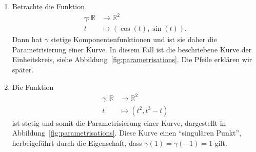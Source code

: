 \documentclass[../main.tex]{subfiles}
\begin{document}
\begin{example}
  \leavevmode
  \begin{enumerate}[(1)]
    \item 
      Betrachte die Funktion
      \begin{align*}
        \gamma \colon \mathbb{R} & \to \mathbb{R}^2 \\
        t & \mapsto (\cos(t), \sin(t)).
      \end{align*}
      Dann hat $\gamma$ stetige
      Komponentenfunktionen und ist sie
      daher die Parametrisierung einer Kurve.
      In diesem Fall ist die beschriebene Kurve
      der Einheitskreis, siehe Abbildung~\ref{fig:parametrisations}.
      Die Pfeile erklären wir später.
    \item Die Funktion
      \begin{align*}
        \gamma \colon \mathbb{R} & \to \mathbb{R}^2 \\
        t & \mapsto (t^2, t^3 - t)
      \end{align*}
      ist stetig und somit die Parametrisierung einer Kurve,
      dargestellt in Abbildung~\ref{fig:parametrisations}.
      Diese Kurve einen ``singulären Punkt'',
      herbeigeführt durch die Eigenschaft,
      dass $\gamma(1) = \gamma(-1) = 1$ gilt.
  \end{enumerate}
\end{example}
\end{document}
